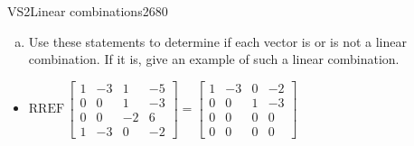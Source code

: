 \begin{exercise}{VS2}{Linear combinations}{2680}
\begin{exerciseStatement}
\begin{enumerate}[(a)]
\begin{itemize}
 \(\left[\begin{array}{c}
-4 \\
-2 \\
5 \\
-1
\end{array}\right]\)is a linear combination of the vectors \(\left[\begin{array}{c}
1 \\
0 \\
0 \\
1
\end{array}\right] , \left[\begin{array}{c}
-3 \\
0 \\
0 \\
-3
\end{array}\right] , \text{ and } \left[\begin{array}{c}
1 \\
1 \\
-2 \\
0
\end{array}\right]\). 

 
\end{itemize}

     
\item  

 Use these statements to determine if each vector is or is not a linear combination. If it is, give an example of such a linear combination. 

 
\end{enumerate}

     \end{exerciseStatement}
 \begin{exerciseAnswer} 

\begin{itemize}
\item  

 \(
\mathrm{RREF}\, \left[\begin{array}{ccc|c}
1 & -3 & 1 & -5 \\
0 & 0 & 1 & -3 \\
0 & 0 & -2 & 6 \\
1 & -3 & 0 & -2
\end{array}\right] = \left[\begin{array}{ccc|c}
1 & -3 & 0 & -2 \\
0 & 0 & 1 & -3 \\
0 & 0 & 0 & 0 \\
0 & 0 & 0 & 0
\end{array}\right]
                        \) 


\end{itemize}
\end{exerciseAnswer}
\end{exercise}
